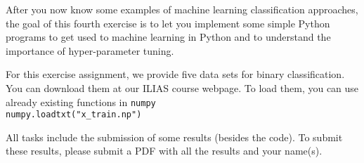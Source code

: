 \documentclass{exam}
\begin{document}
After you now know some examples of machine learning classification approaches,
the goal of this fourth exercise is to let you implement some simple Python programs
to get used to machine learning in Python and to understand the importance of hyper-parameter tuning. 

\bigskip

For this exercise assignment, we provide five data sets for binary classification.
You can download them at our ILIAS course webpage.
To load them, you can use already existing functions in \texttt{numpy}\\
\texttt{numpy.loadtxt("x\_train.np")}

\bigskip

All tasks include the submission of some results (besides the code).
To submit these results, please submit a PDF with all the results and your name(s).
\end{document}
